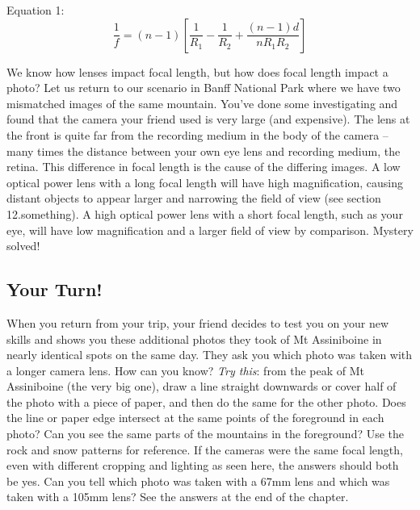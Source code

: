 \documentclass[
]{book}
\begin{document}
Equation 1: \[\frac{1}{f} = (n-1)[\frac{1}{R_1} - \frac{1}{R_2} + \frac{(n-1)d}{nR_1R_2}]\]

We know how lenses impact focal length, but how does focal length impact a photo? Let us return to our scenario in Banff National Park where we have two mismatched images of the same mountain. You've done some investigating and found that the camera your friend used is very large (and expensive). The lens at the front is quite far from the recording medium in the body of the camera -- many times the distance between your own eye lens and recording medium, the retina. This difference in focal length is the cause of the differing images. A low optical power lens with a long focal length will have high magnification, causing distant objects to appear larger and narrowing the field of view (see section 12.something). A high optical power lens with a short focal length, such as your eye, will have low magnification and a larger field of view by comparison. Mystery solved!

\hypertarget{your-turn-5}{%
\subsection*{Your Turn!}\label{your-turn-5}}

When you return from your trip, your friend decides to test you on your new skills and shows you these additional photos they took of Mt Assiniboine in nearly identical spots on the same day. They ask you which photo was taken with a longer camera lens. How can you know?
\emph{Try this}: from the peak of Mt Assiniboine (the very big one), draw a line straight downwards or cover half of the photo with a piece of paper, and then do the same for the other photo. Does the line or paper edge intersect at the same points of the foreground in each photo? Can you see the same parts of the mountains in the foreground? Use the rock and snow patterns for reference. If the cameras were the same focal length, even with different cropping and lighting as seen here, the answers should both be yes. Can you tell which photo was taken with a 67mm lens and which was taken with a 105mm lens? See the answers at the end of the chapter.
\end{document}
